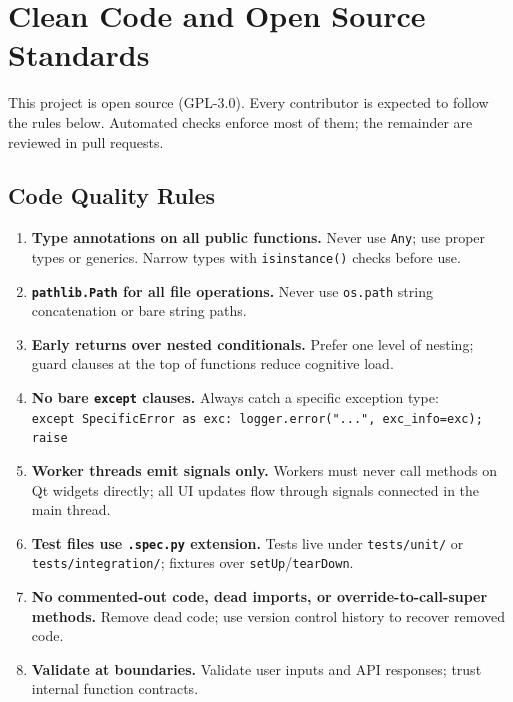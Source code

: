 \documentclass[12pt]{article}
\newcommand{\filepath}[1]{\texttt{\small #1}}
\newcommand{\code}[1]{\texttt{#1}}
\begin{document}
\section{Clean Code and Open Source Standards}
\label{sec:cleancode}

This project is open source (GPL-3.0). Every contributor is expected to follow the rules below. Automated checks enforce most of them; the remainder are reviewed in pull requests.

\subsection{Code Quality Rules}

\begin{enumerate}
\item \textbf{Type annotations on all public functions.} Never use \code{Any}; use proper types or generics. Narrow types with \code{isinstance()} checks before use.
\item \textbf{\code{pathlib.Path} for all file operations.} Never use \code{os.path} string concatenation or bare string paths.
\item \textbf{Early returns over nested conditionals.} Prefer one level of nesting; guard clauses at the top of functions reduce cognitive load.
\item \textbf{No bare \code{except} clauses.} Always catch a specific exception type:\\
  \code{except SpecificError as exc: logger.error("...", exc\_info=exc); raise}
\item \textbf{Worker threads emit signals only.} Workers must never call methods on Qt widgets directly; all UI updates flow through signals connected in the main thread.
\item \textbf{Test files use \code{.spec.py} extension.} Tests live under \filepath{tests/unit/} or \filepath{tests/integration/}; fixtures over \code{setUp}/\code{tearDown}.
\item \textbf{No commented-out code, dead imports, or override-to-call-super methods.} Remove dead code; use version control history to recover removed code.
\item \textbf{Validate at boundaries.} Validate user inputs and API responses; trust internal function contracts.
\end{enumerate}
\end{document}
